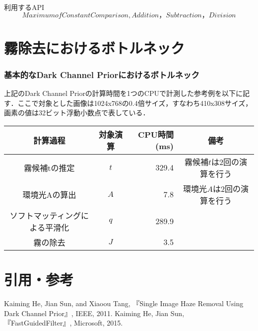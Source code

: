 \documentclass{jsarticle}
\begin{document}
\begin{itembox}[l]{利用するAPI}
\[
Maximum of Constant Comparison, Addition，Subtraction，Division
\]
\end{itembox}


\part{霧除去におけるボトルネック}
\label{霧除去におけるボトルネック}


\section{基本的なDark Channel Priorにおけるボトルネック}
\label{基本的なDark Channel Priorにおけるボトルネック}

上記のDark Channel Priorの計算時間を1つのCPUで計測した参考例を以下に記す．ここで対象とした画像は1024x768の0.4倍サイズ，すなわち410x308サイズ，画素の値は32ビット浮動小数点で表している．

\begin{table}[htb]
  \begin{center}
    \begin{tabular} {|c|c|r|c|} \hline
      計算過程 & 対象演算 & CPU時間(ms) & 備考 \\ \hline
      霧候補tの推定 & $t$ & 329.4 & 霧候補$t$は2回の演算を行う \\
      環境光Aの算出 & $A$ & 7.8 & 環境光$A$は2回の演算を行う \\
      ソフトマッティングによる平滑化 & $q$ & 289.9 & \\
      霧の除去 & $J$ & 3.5 & \\ \hline
    \end{tabular}
  \end{center}
\end{table}


\part{引用・参考}
\label{引用・参考}

\begin{thebibliography}{9}
 Kaiming He, Jian Sun, and Xiaoou Tang, 『Single Image Haze Removal Using Dark Channel Prior』, IEEE,  2011.
 Kaiming He, Jian Sun, 『FastGuidedFilter』, Microsoft, 2015.
\end{thebibliography}
\end{document}
